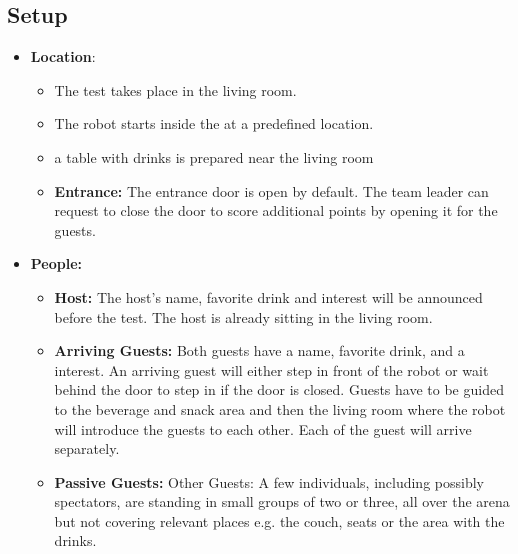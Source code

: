 \subsection*{Setup}
\begin{itemize}
	\item \textbf{Location}: 
	\begin{itemize}
	\item The test takes place in the living room.	
	\item The robot starts inside the \Arena{} at a predefined location.
	\item a table with drinks is prepared near the living room
	\item \textbf{Entrance:} The entrance door is open by default. The team leader can request to close the door to score additional points by opening it for the guests.
	\end{itemize}
	
	\item \textbf{People:} 
	\begin{itemize}
	\item \textbf{Host:} The host's name, favorite drink and interest will be announced before the test. The host is already sitting in the living room.

	\item \textbf{Arriving Guests:} Both guests have a name, favorite drink, and a interest. An arriving guest will either step in front of the robot or wait behind the door to step in if the door is closed. Guests have to be guided to the beverage and snack area and then the living room where the robot will introduce the guests to each other. Each of the guest will arrive separately. 
	
	\item \textbf{Passive Guests:} Other Guests: A few individuals, including possibly spectators, are standing in small groups of two or three, all over the arena but not covering relevant places e.g. the couch, seats or the area with the drinks.
	\end{itemize}

\end{itemize}


